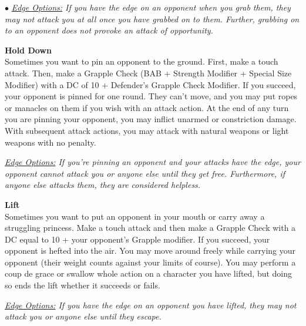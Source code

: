 \begin{list}{$\bullet$}{\itemspace}
	  \smallskip\emph{\underline{Edge Options:} If you have the edge on an opponent when you grab them, they may not attack you at all once you have grabbed on to them. Further, grabbing on to an opponent does not provoke an attack of opportunity.}\\

	 \hypertarget{combat:holddown}{}\hypertarget{combat:pin}{}
	  \normalsize\item\textbf{{Hold Down}}\\\small
	  Sometimes you want to pin an opponent to the ground. First, make a touch attack. Then, make a Grapple Check (BAB + Strength Modifier + Special Size Modifier) with a DC of 10 + Defender's Grapple Check Modifier. If you succeed, your opponent is pinned for one round. They can't move, and you may put ropes or manacles on them if you wish with an attack action. At the end of any turn you are pinning your opponent, you may inflict unarmed or constriction damage. With subsequent attack actions, you may attack with natural weapons or light weapons with no penalty.


	  \smallskip\emph{\underline{Edge Options:} If you're pinning an opponent and your attacks have the edge, your opponent cannot attack you or anyone else until they get free. Furthermore, if anyone else attacks them, they are considered helpless.}\\

	 \hypertarget{combat:lift}{}
	  \normalsize\item\textbf{{Lift}}\\\small
	  Sometimes you want to put an opponent in your mouth or carry away a struggling princess. Make a touch attack and then make a Grapple Check with a DC equal to 10 + your opponent's Grapple modifier. If you succeed, your opponent is hefted into the air. You may move around freely while carrying your opponent (their weight counts against your limits of course). You may perform a coup de grace or swallow whole action on a character you have lifted, but doing so ends the lift whether it succeeds or fails.


	  \smallskip\emph{\underline{Edge Options:} If you have the edge on an opponent you have lifted, they may not attack you or anyone else until they escape.}\\
\end{list}

